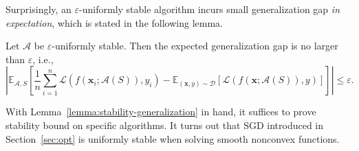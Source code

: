 Surprisingly, an $\varepsilon$-uniformly stable algorithm incurs
small generalization gap \emph{in expectation}, which is stated in the following
lemma.
\begin{lem}\label{lemma:stability-generalization}Let
$\mathcal{A}$ be $\varepsilon$-uniformly stable. Then the expected
generalization gap is no larger than $\varepsilon$, i.e.,
\begin{equation}
\left|\mathbb{E}_{\mathcal{A},S}\left[\frac{1}{n}\sum_{i=1}^{n}\mathcal{L}(f(\bm{x}_{i};\mathcal{A}\left(S\right)),y_{i})-\mathbb{E}_{(\bm{x},y)\sim\mathcal{D}}\left[\mathcal{L}\left(f(\bm{x};\mathcal{A}\left(S\right)),y\right)\right]\right]\right|\leq\varepsilon.\label{eq:stability-generalization-gap}
\end{equation}
\end{lem}

With Lemma~\ref{lemma:stability-generalization} in hand, it suffices to prove stability bound on specific
algorithms. It turns out that SGD introduced
in Section~\ref{sec:opt} is uniformly stable when solving smooth
nonconvex functions.

